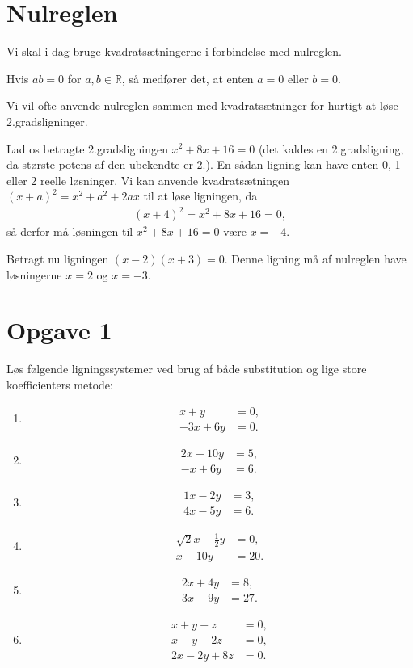 \section*{Nulreglen}
Vi skal i dag bruge kvadratsætningerne i forbindelse med nulreglen. 
\begin{setn}[Nulreglen]
Hvis $ab = 0$ for $a,b\in \mathbb{R}$, så medfører det, at enten $a=0$ eller $b=0$. 
\end{setn}
Vi vil ofte anvende nulreglen sammen med kvadratsætninger for hurtigt at løse 2.gradsligninger. 
\begin{exa}
Lad os betragte 2.gradsligningen $x^2+8x+16=0$ (det kaldes en 2.gradsligning, da største potens af den ubekendte er 2.). En sådan ligning kan have enten 0, 1 eller 2 reelle løsninger. Vi kan anvende kvadratsætningen $(x+a)^2 = x^2+a^2+2ax$ til at løse ligningen, da 
\begin{align*}
(x+4)^2 = x^2+8x+16=0, 
\end{align*}
så derfor må løsningen til $x^2+8x+16=0$ være $x=-4$.
\end{exa}
\begin{exa}
Betragt nu ligningen $(x-2)(x+3)=0$. Denne ligning må af nulreglen have løsningerne $x=2$ og $x=-3$.
\end{exa}
\section*{Opgave 1}
Løs følgende ligningssystemer ved brug af både substitution og lige store koefficienters metode:
\begin{enumerate}[label=\roman*)]
\item \begin{align*}
x+y&=0,\\
-3x+6y&=0.
\end{align*}
\item 
\begin{align*}
2x-10y&=5,\\
-x+6y&=6.
\end{align*}
\item
\begin{align*}
1x-2y&=3,\\
4x-5y&=6.
\end{align*}
\item
\begin{align*}
\sqrt{2}x-\frac{1}{2}y&=0,\\
x-10y&=20.
\end{align*}
\item 
\begin{align*}
2x+4y&=8,\\
3x-9y&=27.
\end{align*}
\item
\begin{align*}
x+y+z&=0,\\
x-y+2z&=0,\\
2x-2y+8z&=0.
\end{align*}
\end{enumerate}
